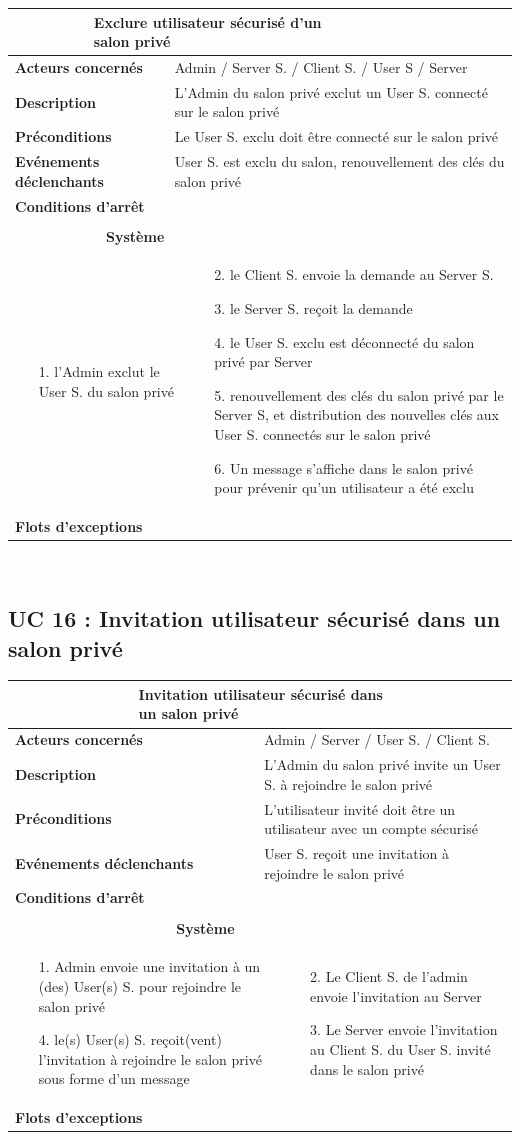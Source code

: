 \documentclass[a4paper,11pt,french]{article}
\newcommand{\fiche}[9] {
	\noindent
\begin{tabular}{|p{3.5cm}| p{1cm} | p{3cm} | p{.5cm} | p{7cm}|} 
\hline
\rowcolor{blue}
\multicolumn{2}{|l|}{\color{white}\bfseries{Nom}} & \multicolumn{3}{l|}{\color{white}\bfseries{#1}}\\
\hline
\multicolumn{2}{|l|}{\bfseries{Acteurs concernés}} & \multicolumn{3}{m{10.5cm}|}{#2}\\
\hline
\multicolumn{2}{|l|}{\bfseries{Description}} & \multicolumn{3}{m{10.5cm}|}{#3}\\
\hline
\multicolumn{2}{|l|}{\bfseries{Préconditions}} & \multicolumn{3}{m{10.5cm}|}{#4}\\
\hline
\multicolumn{2}{|l|}{\bfseries{Evénements déclenchants}} & \multicolumn{3}{m{10.5cm}|}{#5}\\
\hline
\multicolumn{2}{|l|}{\bfseries{Conditions d'arrêt}} & \multicolumn{3}{m{10.5cm}|}{#6}\\
\hline
\rowcolor{gray}
\multicolumn{5}{|c|}{\bfseries{Description du flot d'événements principal}}\\
\hline
\rowcolor{gray}
\multicolumn{3}{|c|}{\bfseries{Acteur(s)}} & \multicolumn{2}{c|}{\bfseries{Système}}\\
\hline
\multicolumn{3}{|p{7.5cm}|}{#7} & \multicolumn{2}{p{7.5cm}|}{#8}\\
\hline
\multicolumn{2}{|l}{\bfseries{Flots d'exceptions}} & \multicolumn{3}{|p{11.5cm}|}{#9}\\
\hline
\end{tabular}
\\
}
\begin{document}
\fiche
	{Exclure utilisateur sécurisé d’un salon privé} %
	{Admin / Server S. / Client S. / User S / Server} %
	{L’Admin du salon privé exclut un User S. connecté sur le salon privé} %
	{Le User S. exclu doit être connecté sur le salon privé} %
	{User S. est exclu du salon, renouvellement des clés du salon privé} %
	{} %
	{\begin{itemize}  %
		\item [1.] l’Admin exclut le User S. du salon privé
	 \end{itemize}
	} 
	{\begin{itemize}  %
		\item []
		\item [2.] le Client S. envoie la demande au Server S.
		\item [3.] le Server S. reçoit la demande
		\item [4.] le User S. exclu est déconnecté du salon privé par Server
		\item [5.] renouvellement des clés du salon privé par le Server S, et distribution des nouvelles clés aux User S. connectés sur le salon privé
		\item [6.] Un message s’affiche dans le salon privé pour prévenir qu’un utilisateur a été exclu
	 \end{itemize}
	 }
	{} %

\subsection{UC 16 : Invitation utilisateur sécurisé dans un salon privé}

\fiche
	{Invitation utilisateur sécurisé dans un salon privé} %
	{Admin / Server / User S. / Client S.} %
	{L’Admin du salon privé invite un User S. à rejoindre le salon privé} %
	{L’utilisateur invité doit être un utilisateur avec un compte  sécurisé} %
	{User S. reçoit une invitation à rejoindre le salon privé} %
	{} %
	{\begin{itemize}  %
		\item [1.] Admin envoie une invitation à un (des) User(s) S. pour rejoindre le salon privé
		\item []
		\item []
		\item [4.] le(s) User(s) S. reçoit(vent) l’invitation à rejoindre le salon privé sous forme d’un message
	 \end{itemize}
	} 
	{\begin{itemize}  %
		\item []
		\item [2.] Le Client S. de l’admin envoie l’invitation au Server
		\item [3.] Le Server envoie l’invitation au Client S. du User S. invité dans le salon privé
	 \end{itemize}
	 }
	{} %
	
\end{document}
